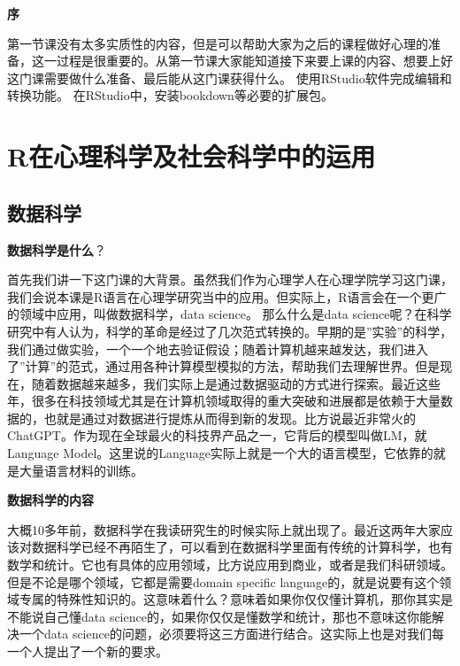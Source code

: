 \documentclass[
  oneside]{book}
\begin{document}
\textbf{序}

第一节课没有太多实质性的内容，但是可以帮助大家为之后的课程做好心理的准备，这一过程是很重要的。从第一节课大家能知道接下来要上课的内容、想要上好这门课需要做什么准备、最后能从这门课获得什么。
使用RStudio软件完成编辑和转换功能。
在RStudio中，安装bookdown等必要的扩展包。

\hypertarget{rux5728ux5fc3ux7406ux79d1ux5b66ux53caux793eux4f1aux79d1ux5b66ux4e2dux7684ux8fd0ux7528}{%
\section{R在心理科学及社会科学中的运用}\label{rux5728ux5fc3ux7406ux79d1ux5b66ux53caux793eux4f1aux79d1ux5b66ux4e2dux7684ux8fd0ux7528}}

\hypertarget{1-data-science}{%
\subsection{数据科学}\label{1-data-science}}

\textbf{数据科学是什么}？

首先我们讲一下这门课的大背景。虽然我们作为心理学人在心理学院学习这门课，我们会说本课是R语言在心理学研究当中的应用。但实际上，R语言会在一个更广的领域中应用，叫做数据科学，data
science。 那么什么是data
science呢？在科学研究中有人认为，科学的革命是经过了几次范式转换的。早期的是''实验''的科学，我们通过做实验，一个一个地去验证假设；随着计算机越来越发达，我们进入了''计算''的范式，通过用各种计算模型模拟的方法，帮助我们去理解世界。但是现在，随着数据越来越多，我们实际上是通过数据驱动的方式进行探索。最近这些年，很多在科技领域尤其是在计算机领域取得的重大突破和进展都是依赖于大量数据的，也就是通过对数据进行提炼从而得到新的发现。比方说最近非常火的ChatGPT。作为现在全球最火的科技界产品之一，它背后的模型叫做LM，就Language
Model。这里说的Language实际上就是一个大的语言模型，它依靠的就是大量语言材料的训练。

\textbf{数据科学的内容}

大概10多年前，数据科学在我读研究生的时候实际上就出现了。最近这两年大家应该对数据科学已经不再陌生了，可以看到在数据科学里面有传统的计算科学，也有数学和统计。它也有具体的应用领域，比方说应用到商业，或者是我们科研领域。但是不论是哪个领域，它都是需要domain
specific
language的，就是说要有这个领域专属的特殊性知识的。这意味着什么？意味着如果你仅仅懂计算机，那你其实是不能说自己懂data
science的，如果你仅仅是懂数学和统计，那也不意味这你能解决一个data
science的问题，必须要将这三方面进行结合。这实际上也是对我们每一个人提出了一个新的要求。
\end{document}
